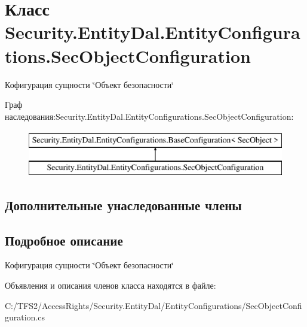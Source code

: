 \hypertarget{class_security_1_1_entity_dal_1_1_entity_configurations_1_1_sec_object_configuration}{}\section{Класс Security.\+Entity\+Dal.\+Entity\+Configurations.\+Sec\+Object\+Configuration}
\label{class_security_1_1_entity_dal_1_1_entity_configurations_1_1_sec_object_configuration}


Кофигурация сущности \char`\"{}Объект безопасности\char`\"{}  


Граф наследования\+:Security.\+Entity\+Dal.\+Entity\+Configurations.\+Sec\+Object\+Configuration\+:\begin{figure}[H]
\begin{center}
\leavevmode
\includegraphics[height=2.000000cm]{d1/de2/class_security_1_1_entity_dal_1_1_entity_configurations_1_1_sec_object_configuration}
\end{center}
\end{figure}
\subsection*{Дополнительные унаследованные члены}


\subsection{Подробное описание}
Кофигурация сущности \char`\"{}Объект безопасности\char`\"{} 



Объявления и описания членов класса находятся в файле\+:\begin{DoxyCompactItemize}
\item 
C\+:/\+T\+F\+S2/\+Access\+Rights/\+Security.\+Entity\+Dal/\+Entity\+Configurations/Sec\+Object\+Configuration.\+cs\end{DoxyCompactItemize}
